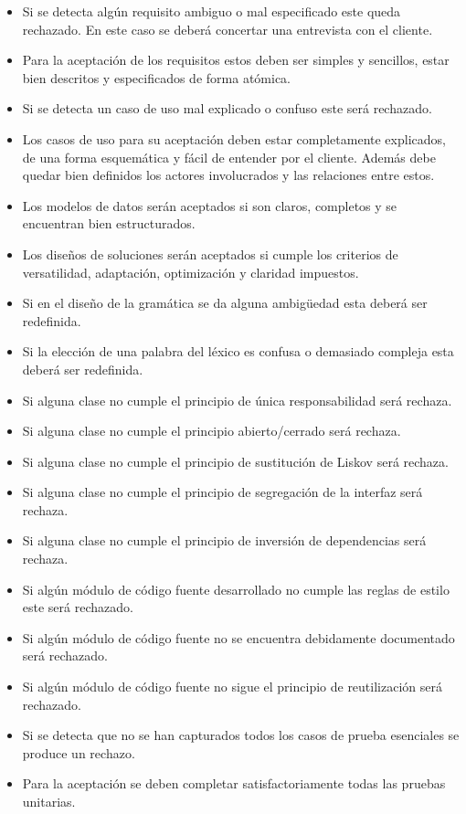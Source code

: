 \begin{itemize}
\item Si se detecta algún requisito ambiguo o mal especificado este queda rechazado. En este caso se deberá concertar una entrevista con el cliente.
\item Para la aceptación de los requisitos estos deben ser simples y sencillos, estar bien descritos y especificados de forma atómica.
\item Si se detecta un caso de uso mal explicado o confuso este será rechazado. 
\item Los casos de uso para su aceptación deben estar completamente explicados, de una forma esquemática y fácil de entender por el cliente. Además debe quedar bien definidos 
los actores involucrados y las relaciones entre estos. 
\item Los modelos de datos serán aceptados si son claros, completos y se encuentran bien estructurados.
\item Los diseños de soluciones serán aceptados si cumple los criterios de versatilidad, adaptación, optimización y claridad impuestos.
\item Si en el diseño de la gramática se da alguna ambigüedad esta deberá ser redefinida.
\item Si la elección de una palabra del léxico es confusa o demasiado compleja esta deberá ser redefinida.
\item Si alguna clase no cumple el principio de única responsabilidad será rechaza.
\item Si alguna clase no cumple el principio abierto/cerrado será rechaza.
\item Si alguna clase no cumple el principio de sustitución de Liskov será rechaza.
\item Si alguna clase no cumple el principio de segregación de la interfaz será rechaza.
\item Si alguna clase no cumple el principio de inversión de dependencias será rechaza.
\item Si algún módulo de código fuente desarrollado no cumple las reglas de estilo este será rechazado.
\item Si algún módulo de código fuente no se encuentra debidamente documentado será rechazado.
\item Si algún módulo de código fuente no sigue el principio de reutilización será rechazado.
\item Si se detecta que no se han capturados todos los casos de prueba esenciales se produce un rechazo.
\item Para la aceptación se deben completar satisfactoriamente todas las pruebas unitarias.
\end{itemize}
